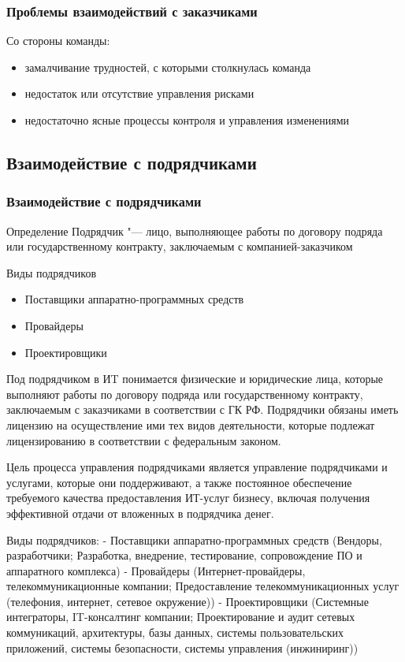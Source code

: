 \documentclass{../industrial-development}
\begin{document}
\begin{frame} \frametitle{Проблемы взаимодействий с заказчиками}
	Со стороны команды:
	\begin{itemize}
		\item замалчивание трудностей, с которыми столкнулась команда
		\item недостаток или отсутствие управления рисками
		\item недостаточно ясные процессы контроля и управления изменениями
	\end{itemize}
\end{frame}

\subsection{Взаимодействие с подрядчиками}
\begin{frame} \frametitle{Взаимодействие с подрядчиками}
	\begin{block}{Определение}
		\alert{Подрядчик} "--- лицо, выполняющее работы по договору подряда или государственному контракту, заключаемым с компанией-заказчиком
	\end{block}

	\begin{block}{Виды подрядчиков}
		\begin{itemize}
			\item Поставщики аппаратно-программных средств
			\item Провайдеры
			\item Проектировщики
		\end{itemize}
	\end{block}
\end{frame}

\lecturenotes
Под подрядчиком в ИT понимается физические и юридические лица, которые выполняют работы по договору подряда или государственному контракту, заключаемым с заказчиками в соответствии с ГК РФ. Подрядчики обязаны иметь лицензию на осуществление ими тех видов деятельности, которые подлежат лицензированию в соответствии с федеральным законом.

Цель процесса управления подрядчиками является управление подрядчиками и услугами, которые они поддерживают, а также постоянное обеспечение требуемого качества предоставления ИТ-услуг бизнесу, включая получения эффективной отдачи от вложенных в подрядчика денег.

Виды подрядчиков:
- Поставщики аппаратно-программных средств (Вендоры, разработчики; Разработка, внедрение, тестирование, сопровождение ПО и аппаратного комплекса)
- Провайдеры (Интернет-провайдеры, телекоммуникационные компании; Предоставление телекоммуникационных услуг (телефония, интернет, сетевое окружение))
- Проектировщики (Системные интеграторы, IT-консалтинг компании; Проектирование и аудит сетевых коммуникаций, архитектуры, базы данных, системы пользовательских приложений, системы безопасности, системы управления (инжиниринг))
\end{document}
